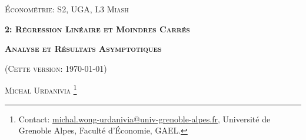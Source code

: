 

\usepackage{tikz}
\usepackage{enumitem}


\usepackage{fancyhdr}
\pagestyle{fancy}
\fancyhead{}
\fancyfoot{} 
\fancyfoot[C]{\small{\thepage}}
\renewcommand{\footrulewidth}{0pt}



 
\usetikzlibrary{positioning}
\usetikzlibrary{snakes}
\usetikzlibrary{calc}
\usetikzlibrary{arrows}
\usetikzlibrary{decorations.markings}
\usetikzlibrary{shapes.misc}
\usetikzlibrary{shapes}

\begin{titlepage}
\centering
	{\scshape\Large \textsc{Économétrie: S2, UGA, L3 Miash}\par}
	\vspace{1cm}
	{\Large\bfseries \textsc{2: Régression Linéaire et Moindres Carrés} \par}
    \vspace{1cm}   
	{\Large\bfseries \textsc{Analyse et Résultats Asymptotiques} \par}
	\vspace{1cm}
	{(\textsc{Cette version: \today})\par}
	\vspace{1cm}
	{\large \textsc{Michal Urdanivia}
	\footnote{Contact:  
	\href{mailto:michal.wong-urdanivia@univ-grenoble-alpes.fr}{michal.wong-urdanivia@univ-grenoble-alpes.fr}, 
	 Université de Grenoble Alpes,  Faculté d'\'Economie, GAEL.}\par}
	
\end{titlepage}

